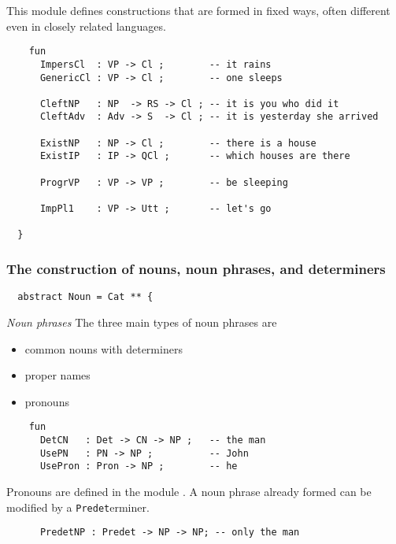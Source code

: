 \documentclass[11pt,a4paper]{article}
\newcommand{\commOut}[1]{}
\newcommand{\subsubsubsection}[1]{\textit{#1}}
\begin{document}
This module defines constructions that are formed in fixed ways,
often different even in closely related languages.

\begin{verbatim}
    fun
      ImpersCl  : VP -> Cl ;        -- it rains
      GenericCl : VP -> Cl ;        -- one sleeps
  
      CleftNP   : NP  -> RS -> Cl ; -- it is you who did it
      CleftAdv  : Adv -> S  -> Cl ; -- it is yesterday she arrived
  
      ExistNP   : NP -> Cl ;        -- there is a house
      ExistIP   : IP -> QCl ;       -- which houses are there
  
      ProgrVP   : VP -> VP ;        -- be sleeping
  
      ImpPl1    : VP -> Utt ;       -- let's go
  
  }
\end{verbatim}

\commOut{Produced by 
gfdoc - a rudimentary GF document generator.
(c) Aarne Ranta (\htmladdnormallink{aarne@cs.chalmers.se}{mailto:aarne@cs.chalmers.se}) 2002 under GNU GPL.}


\subsubsection{The construction of nouns, noun phrases, and determiners}
\begin{verbatim}
  abstract Noun = Cat ** {
\end{verbatim}

\subsubsubsection{Noun phrases}
The three main types of noun phrases are

\begin{itemize}
\item common nouns with determiners
\item proper names
\item pronouns
\end{itemize}

\begin{verbatim}
    fun
      DetCN   : Det -> CN -> NP ;   -- the man
      UsePN   : PN -> NP ;          -- John
      UsePron : Pron -> NP ;        -- he
\end{verbatim}

Pronouns are defined in the module .
A noun phrase already formed can be modified by a \texttt{Predet}erminer.

\begin{verbatim}
      PredetNP : Predet -> NP -> NP; -- only the man 
\end{verbatim}
\end{document}
